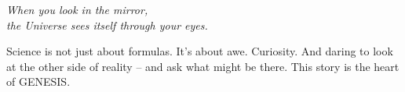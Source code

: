 \documentclass{article}
\begin{document}
\clearpage
\vspace*{\fill}
\begin{center}
\textit{When you look in the mirror,\\
the Universe sees itself through your eyes.}
\end{center}
\vspace*{\fill}



\begin{tcolorbox}[colback=black!1!white, colframe=black!30, title=Why this matters]
Science is not just about formulas.  
It's about awe. Curiosity. And daring to look at the other side of reality – and ask what might be there.  
This story is the heart of GENESIS.
\end{tcolorbox}




\end{document}
